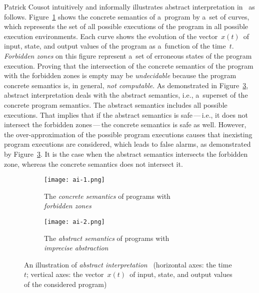Patrick Cousot intuitively and informally illustrates abstract interpretation in~\cite{AIInNutshellCousot} as follows. Figure~\ref{fig:ai1} shows the concrete semantics of a~program by a~set of curves, which represents the set of all possible executions of the program in all possible execution environments. Each curve shows the evolution of the vector~$ x(t) $~of input, state, and output values of the program as a~function of the time~$ t $. \emph{Forbidden zones} on this figure represent a~set of erroneous states of the program execution. Proving that the intersection of the concrete semantics of the program with the forbidden zones is empty may be \emph{undecidable} because the program concrete semantics is, in general, \emph{not computable}. As demonstrated in Figure~\ref{fig:ai2}, abstract interpretation deals with the abstract semantics, i.e., a~superset of the concrete program semantics. The abstract semantics includes all possible executions. That implies that if the abstract semantics is safe\,---\,i.e., it does not intersect the forbidden zones\,---\,the concrete semantics is safe as well. However, the over-approximation of the possible program executions causes that inexisting program executions are considered, which leads to false alarms, as demonstrated by Figure~\ref{fig:ai2}. It is the case when the abstract semantics intersects the forbidden zone, whereas the concrete semantics does not intersect it.

\vfill

\begin{figure}[hbt]
    \centering

    \begin{subfigure}[t]{.49 \linewidth}
        \centering
        \texttt{[image: ai-1.png]}
        \caption{The \emph{concrete semantics} of programs with \\ \emph{forbidden zones}}
        \label{fig:ai1}
    \end{subfigure}
%
    \hfill
%
    \begin{subfigure}[t]{.49 \linewidth}
        \centering
        \texttt{[image: ai-2.png]}
        \caption{The \emph{abstract semantics} of programs with \\ \emph{imprecise abstraction}}
        \label{fig:ai2}
    \end{subfigure}

    \caption{An illustration of \emph{abstract interpretation}~\cite{AIInNutshellCousot} (horizontal axes: the time~$ t $; vertical axes: the vector~$ x(t) $~of input, state, and output values of the considered program)}
\end{figure}

